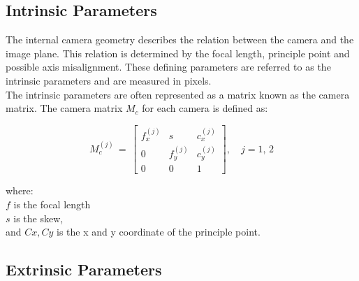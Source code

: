 %
%


\subsection{Intrinsic Parameters}
\label{sec:intrinsic}

The internal camera geometry describes the relation between the camera and the image plane. This relation is determined by the focal length, principle point and possible axis misalignment. These defining parameters are referred to as the intrinsic parameters and are measured in pixels.\\

The intrinsic parameters are often represented as a matrix known as the camera matrix. The camera matrix $M_c$ for each camera is defined as:

\begin{equation}\label{eq:cm}
M_c^{(j)}\,=\,\begin{bmatrix}
{f_x^{(j)}} & {s} & {c_x^{(j)}}\\
{0} & {f_y^{(j)}} & {c_y^{(j)}}\\
{0} & {0} & {1}
\end{bmatrix},\quad j = 1,\, 2
\end{equation}

where:\\
$f$ is the focal length\\
$s$ is the skew,\\
and $Cx, Cy$ is the x and y coordinate of the principle point.

\subsection{Extrinsic Parameters}

